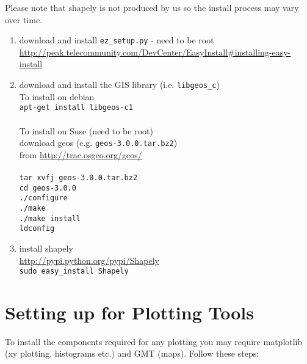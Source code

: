 \documentclass[a4paper, 12pt]{article}
\begin{document}
Please note that shapely is not produced by us so the install
process may vary over time.
\begin{enumerate}

\item download and install \texttt{ez\_setup.py} - need to be root \\
\scriptsize
\url{http://peak.telecommunity.com/DevCenter/EasyInstall#installing-easy-install}
\normalsize

\item download and install the GIS library (i.e.
\texttt{libgeos\_c}) \\
To install on debian \\
\texttt{apt-get install libgeos-c1}\\
 \\
To install on Suse (need to be root) \\
download geos (e.g. \texttt{geos-3.0.0.tar.bz2}) \\
from \url{http://trac.osgeo.org/geos/} \\
 \\
\texttt{tar xvfj geos-3.0.0.tar.bz2} \\
\texttt{cd geos-3.0.0} \\
\texttt{./configure} \\
\texttt{./make} \\
\texttt{./make install} \\
\texttt{ldconfig}

\item install shapely \\
\url{http://pypi.python.org/pypi/Shapely} \\
\texttt{sudo easy\_install Shapely}

\end{enumerate}

\section{Setting up for Plotting Tools} \label{sec:-plotting-tools}


To install the components required for any plotting you may require
matplotlib (xy plotting, histograms etc.) and GMT (maps). Follow
these steps:
\end{document}
